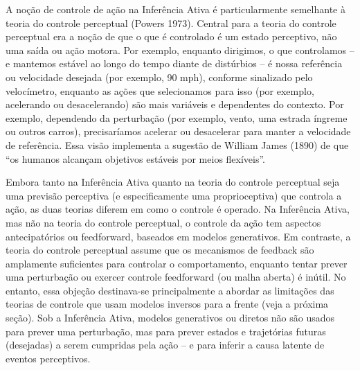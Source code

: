 \documentclass[
  12pt,
]{book}
\begin{document}
A noção de controle de ação na Inferência Ativa é particularmente semelhante à teoria do controle perceptual (Powers 1973). Central para a teoria do controle perceptual era a noção de que o que é controlado é um estado perceptivo, não uma saída ou ação motora. Por exemplo, enquanto dirigimos, o que controlamos -- e mantemos estável ao longo do tempo diante de distúrbios -- é nossa referência ou velocidade desejada (por exemplo, 90 mph), conforme sinalizado pelo velocímetro, enquanto as ações que selecionamos para isso (por exemplo, acelerando ou desacelerando) são mais variáveis e dependentes do contexto. Por exemplo, dependendo da perturbação (por exemplo, vento, uma estrada íngreme ou outros carros), precisaríamos acelerar ou desacelerar para manter a velocidade de referência. Essa visão implementa a sugestão de William James (1890) de que ``os humanos alcançam objetivos estáveis por meios flexíveis''.

Embora tanto na Inferência Ativa quanto na teoria do controle perceptual seja uma previsão perceptiva (e especificamente uma proprioceptiva) que controla a ação, as duas teorias diferem em como o controle é operado. Na Inferência Ativa, mas não na teoria do controle perceptual, o controle da ação tem aspectos antecipatórios ou feedforward, baseados em modelos generativos. Em contraste, a teoria do controle perceptual assume que os mecanismos de feedback são amplamente suficientes para controlar o comportamento, enquanto tentar prever uma perturbação ou exercer controle feedforward (ou malha aberta) é inútil. No entanto, essa objeção destinava-se principalmente a abordar as limitações das teorias de controle que usam modelos inversos para a frente (veja a próxima seção). Sob a Inferência Ativa, modelos generativos ou diretos não são usados para prever uma perturbação, mas para prever estados e trajetórias futuras (desejadas) a serem cumpridas pela ação -- e para inferir a causa latente de eventos perceptivos.
\end{document}
